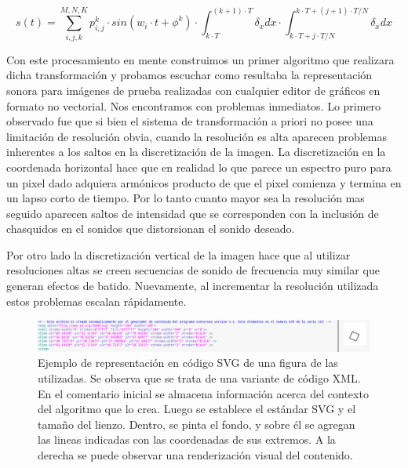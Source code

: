 \documentclass{article}
\begin{document}
    \begin{equation}
        \label{ec:VoiceOriginal}
        s(t) = \sum_{i,j,k}^{M,N,K} p_{i,j}^k \cdot sin(w_i \cdot t + \phi^k) \cdot \int_{k \cdot T}^{(k+1) \cdot T} \delta_x dx \cdot \int_{k \cdot T+j \cdot T/N}^{k \cdot T + (j+1) \cdot T/N} \delta_x dx
    \end{equation}

    Con este procesamiento en mente construimos un primer algoritmo que realizara dicha transformación y probamos escuchar como resultaba la representación sonora para imágenes de prueba realizadas con cualquier editor de gráficos en formato no vectorial. Nos encontramos con problemas inmediatos. Lo primero observado fue que si bien el sistema de transformación a priori no posee una limitación de resolución obvia, cuando la resolución es alta aparecen problemas inherentes a los saltos en la discretización de la imagen. La discretización en la coordenada horizontal hace que en realidad lo que parece un espectro puro para un pixel dado adquiera armónicos producto de que el pixel comienza y termina en un lapso corto de tiempo. Por lo tanto cuanto mayor sea la resolución mas seguido aparecen saltos de intensidad que se corresponden con la inclusión de chasquidos en el sonidos que distorsionan el sonido deseado. 
    
    Por otro lado la discretización vertical de la imagen hace que al utilizar resoluciones altas se creen secuencias de sonido de frecuencia muy similar que generan efectos de batido. Nuevamente, al incrementar la resolución utilizada estos problemas escalan rápidamente. 
    
    \begin{figure}
        \center
        \includegraphics[width=\textwidth]{Imagenes/678SVG.png}
        \caption{Ejemplo de representación en código SVG de una figura de las utilizadas. Se observa que se trata de una variante de código XML. En el comentario inicial se almacena información acerca del contexto del algoritmo que lo crea. Luego se establece el estándar SVG y el tamaño del lienzo. Dentro, se pinta el fondo, y sobre él se agregan las lineas indicadas con las coordenadas de sus extremos. A la derecha se puede observar una renderización visual del contenido.}
        \label{fig:SVGtoPNG}
    \end{figure}
    
\end{document}
